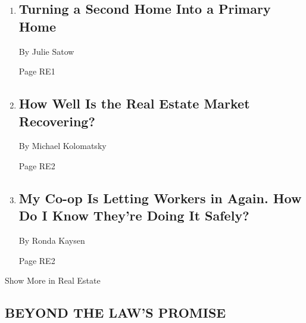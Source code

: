 \begin{enumerate}
\def\labelenumi{\arabic{enumi}.}
\item
  \href{/2020/07/24/realestate/coronavirus-second-homes-.html}{}

  \hypertarget{turning-a-second-home-into-a-primary-home}{%
  \subsection{Turning a Second Home Into a Primary
  Home}\label{turning-a-second-home-into-a-primary-home}}

  By Julie Satow

  Page RE1
\item
  \href{/2020/07/23/realestate/real-estate-market-coronavurus-recovery.html}{}

  \hypertarget{how-well-is-the-real-estate-market-recovering}{%
  \subsection{How Well Is the Real Estate Market
  Recovering?}\label{how-well-is-the-real-estate-market-recovering}}

  By Michael Kolomatsky

  Page RE2
\item
  \href{/2020/07/25/realestate/coronavirus-reopening-workers-in-buildings-rules.html}{}

  \hypertarget{my-co-op-is-letting-workers-in-again-how-do-i-know-theyre-doing-it-safely}{%
  \subsection{My Co-op Is Letting Workers in Again. How Do I Know
  They're Doing It
  Safely?}\label{my-co-op-is-letting-workers-in-again-how-do-i-know-theyre-doing-it-safely}}

  By Ronda Kaysen

  Page RE2
\end{enumerate}

Show More in Real Estate

\hypertarget{beyond-the-laws-promise}{%
\subsection{BEYOND THE LAW'S PROMISE}\label{beyond-the-laws-promise}}

